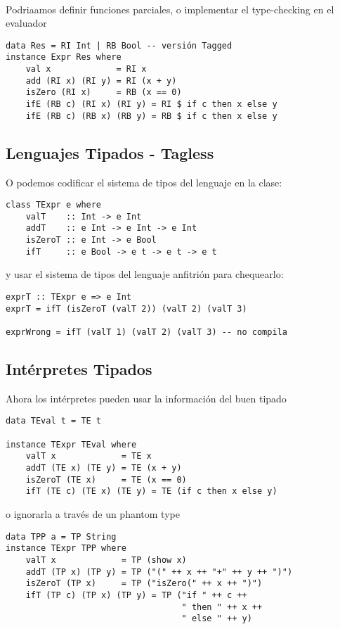 \documentclass{article}
\newcommand{\imp}[1]{\textcolor{color1}{#1}}
\begin{document}
\

Podriaamos definir funciones \imp{parciales}, o implementar el \imp{type-checking} en el evaluador 

\begin{lstlisting}
data Res = RI Int | RB Bool -- versión Tagged
instance Expr Res where
    val x             = RI x
    add (RI x) (RI y) = RI (x + y)
    isZero (RI x)     = RB (x == 0)
    ifE (RB c) (RI x) (RI y) = RI $ if c then x else y
    ifE (RB c) (RB x) (RB y) = RB $ if c then x else y
\end{lstlisting}

\subsection{Lenguajes Tipados - Tagless}

O podemos codificar el \imp{sistema de tipos} del lenguaje en la clase:

\begin{lstlisting}
class TExpr e where
    valT    :: Int -> e Int
    addT    :: e Int -> e Int -> e Int
    isZeroT :: e Int -> e Bool
    ifT     :: e Bool -> e t -> e t -> e t
\end{lstlisting}

y usar el sistema de tipos del lenguaje anfitrión para chequearlo:

\begin{lstlisting}
exprT :: TExpr e => e Int
exprT = ifT (isZeroT (valT 2)) (valT 2) (valT 3)

exprWrong = ifT (valT 1) (valT 2) (valT 3) -- no compila
\end{lstlisting}

\subsection{Intérpretes Tipados}

Ahora los intérpretes pueden usar la información del buen tipado

\begin{lstlisting}
data TEval t = TE t

instance TExpr TEval where
    valT x             = TE x
    addT (TE x) (TE y) = TE (x + y)
    isZeroT (TE x)     = TE (x == 0)
    ifT (TE c) (TE x) (TE y) = TE (if c then x else y)
\end{lstlisting}

o ignorarla a través de un \imp{phantom type}

\begin{lstlisting}
data TPP a = TP String
instance TExpr TPP where
    valT x             = TP (show x)
    addT (TP x) (TP y) = TP ("(" ++ x ++ "+" ++ y ++ ")")
    isZeroT (TP x)     = TP ("isZero(" ++ x ++ ")")
    ifT (TP c) (TP x) (TP y) = TP ("if " ++ c ++
                                   " then " ++ x ++
                                   " else " ++ y)
\end{lstlisting}
\end{document}
